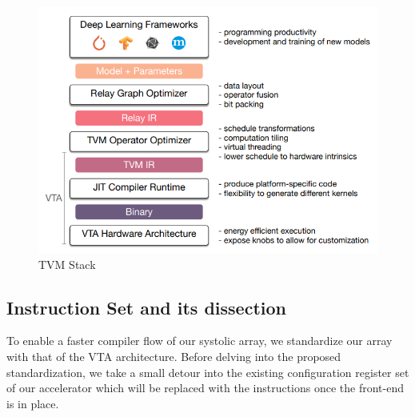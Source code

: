 \begin{figure}[h]
    \centering
    \includegraphics[scale=0.3]{images/vta.png}
    \caption{TVM Stack}
    \label{fig:vtastack}
\end{figure}

\subsection{Instruction Set and its dissection}

To enable a faster compiler flow of our systolic array, we standardize our array with that of the VTA architecture. Before delving into the proposed standardization, we take a small detour into the existing configuration register set of our accelerator which will be replaced with the instructions once the front-end is in place.

